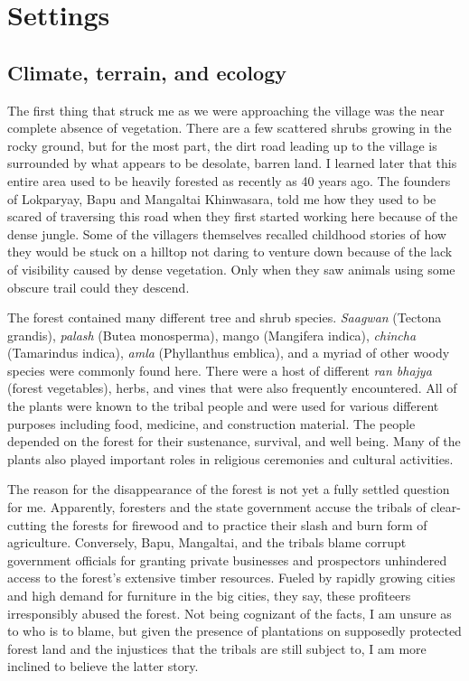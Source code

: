 \documentclass{article}
\begin{document}
\clearpage\section{Settings}
\subsection{Climate, terrain, and ecology}

The first thing that struck me as we were approaching the village was the near complete absence of vegetation. There are a few scattered shrubs growing in the rocky ground, but for the most part, the dirt road leading up to the village is surrounded by what appears to be desolate, barren land. I learned later that this entire area used to be heavily forested as recently as 40 years ago. The founders of Lokparyay, Bapu and Mangaltai Khinwasara, told me how they used to be scared of traversing this road when they first started working here because of the dense jungle. Some of the villagers themselves recalled childhood stories of how they would be stuck on a hilltop not daring to venture down because of the lack of visibility caused by dense vegetation. Only when they saw animals using some obscure trail could they descend.

The forest contained many different tree and shrub species. \textit{Saagwan} (Tectona grandis), \textit{palash} (Butea monosperma), mango (Mangifera indica), \textit{chincha} (Tamarindus indica), \textit{amla} (Phyllanthus emblica), and a myriad of other woody species were commonly found here. There were a host of different \textit{ran bhajya} (forest vegetables), herbs, and vines that were also frequently encountered. All of the plants were known to the tribal people and were used for various different purposes including food, medicine, and construction material. The people depended on the forest for their sustenance, survival, and well being. Many of the plants also played important roles in religious ceremonies and cultural activities.

The reason for the disappearance of the forest is not yet a fully settled question for me. Apparently, foresters and the state government accuse the tribals of clear-cutting the forests for firewood and to practice their slash and burn form of agriculture. Conversely, Bapu, Mangaltai, and the tribals blame corrupt government officials for granting private businesses and prospectors unhindered access to the forest's extensive timber resources. Fueled by rapidly growing cities and high demand for furniture in the big cities, they say, these profiteers irresponsibly abused the forest. Not being cognizant of the facts, I am unsure as to who is to blame, but given the presence of plantations on supposedly protected forest land and the injustices that the tribals are still subject to, I am more inclined to believe the latter story.
\end{document}

